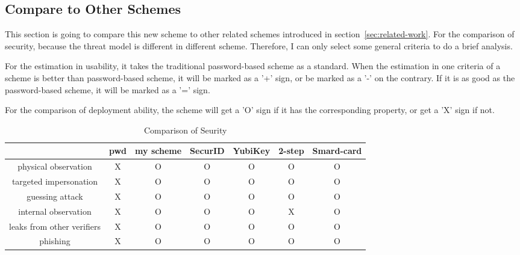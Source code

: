 \begin{CJK}{Bg5}{bsmi}


\chapter{Compare to Other Schemes}

This section is going to compare this new scheme to other related schemes introduced in section~\ref{sec:related-work}. For the comparison of security, because the threat model is different in different scheme. Therefore, I can only select some general criteria to do a brief analysis. 

For the estimation in usability, it takes the traditional password-based scheme as a standard. When the estimation in one criteria of a scheme is better than password-based scheme, it will be marked as a '+' sign, or be marked as a '-' on the contrary. If it is as good as the password-based scheme, it will be marked as a '=' sign. 

For the comparison of deployment ability, the scheme will get a 'O' sign if it has the corresponding property, or get a 'X' sign if not.

\begin{table}[h]
\begin{tabular}{|c|c|c|c|c|c|c|}
\hline
                           & pwd & my scheme & SecurID & YubiKey & 2-step & Smard-card \\ \hline
physical observation       & X   & O         & O       & O       & O       & O          \\ \hline
targeted impersonation     & X   & O         & O       & O       & O       & O          \\ \hline
guessing attack            & X   & O         & O       & O       & O       & O          \\ \hline
internal observation       & X   & O         & O       & O       & X       & O          \\ \hline
leaks from other verifiers & X   & O         & O       & O       & O       & O          \\ \hline
phishing                   & X   & O         & O       & O       & O       & O          \\ \hline
\end{tabular}
\caption{Comparison of Seurity}
\end{table}


\end{CJK}
